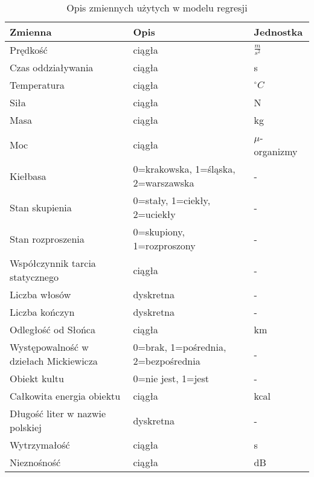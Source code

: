 \begin{table}[ht]
\centering
\caption{Opis zmiennych użytych w modelu regresji}
\label{tab:opis_zmiennych}
\tiny %
\begin{tabular}{p{4cm}p{2.5cm}p{1.5cm}}
\hline
\textbf{Zmienna} & \textbf{Opis} & \textbf{Jednostka} \\
\hline
Prędkość                        & ciągła                                & $\frac{m}{s^2}$\\
Czas oddziaływania              & ciągła                                & s\\
Temperatura                     & ciągła                                & $^\circ C$\\ 
Siła                            & ciągła                                & N \\
Masa                            & ciągła                                & kg\\
Moc                             & ciągła                                & $\mu$-organizmy\\
Kiełbasa                        & 0=krakowska, 1=śląska, 2=warszawska   & -\\
Stan skupienia                  & 0=stały, 1=ciekły, \mbox{2=uciekły}   & -\\
Stan rozproszenia               & 0=skupiony, \mbox{1=rozproszony}      & -\\
Współczynnik tarcia statycznego & ciągła                                & -\\
Liczba włosów                   & dyskretna                             & -\\
Liczba kończyn                  & dyskretna                             & -\\
Odległość od Słońca             & ciągła                                & km\\
Występowalność w dziełach Mickiewicza   & 0=brak, 1=pośrednia, 2=bezpośrednia   & -\\
Obiekt kultu                    & 0=nie jest, 1=jest                    & -\\
Całkowita energia obiektu       & ciągła                                & kcal\\
Długość liter w nazwie polskiej & dyskretna                             & -\\
Wytrzymałość                    & ciągła                                & s\\
Nieznośność                     & ciągła                                & dB\\

\end{tabular}
\end{table}
